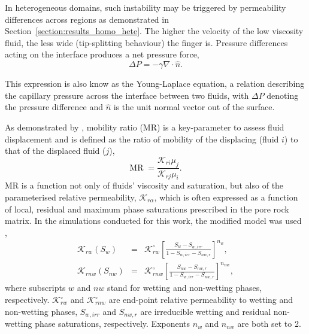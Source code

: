 \documentclass[preprint,authoryear,12pt]{elsarticle}
\newcommand{\frc}{\displaystyle\frac}
\begin{document}
\medskip 
In heterogeneous domains, such instability may be triggered by permeability differences across regions as demonstrated in Section~\ref{section:results_homo_hete}. The higher the velocity of the low viscosity fluid, the less wide (tip-splitting behaviour) the finger is. Pressure differences acting on the interface produces a net pressure force,      
\begin{equation} 
\Delta P= - \gamma \nabla\cdot\hat{n}. 
\label{eq:pressure_dif} 
\end{equation}

\noindent This expression is also know as the Young-Laplace equation, a relation describing the capillary pressure across the interface between two fluids, with $\Delta P$ denoting the pressure difference and $\hat{n}$ is the unit normal vector out of the surface. 

\medskip
As demonstrated by \citet{habermann_1960} \citep[see also][]{budek_2017}, mobility ratio (MR) is a key-parameter to assess fluid displacement and is defined as the ratio of mobility of the displacing (fluid $i$) to that of the displaced fluid ($j$),
\begin{equation}
 \text{MR} \; = \frac{\mathcal{K}_{ri} \mu_{j}}{\mathcal{K}_{rj} \mu_{i}}. 
\label{eq:MR}
\end{equation}
MR is a function not only of fluids' viscosity and saturation, but also of the parameterised relative permeability, $\mathcal{K}_{r\alpha}$, which is often expressed as a function of local, residual and maximum phase saturations prescribed in the pore rock matrix. In the simulations conducted for this work, the modified \cite{brooks_1964} model was used \citep{alpak_1999},
\begin{eqnarray}
  \mathcal{K}_{rw}\left(S_{w}\right) &=& \mathcal{K}^{\circ}_{rw}\left[\frc{S_{w}-S_{w,irr}}{1-S_{w,irr}-S_{nw,r}}\right]^{n_{w}}, \label{Eqn:CoreyBrooks1}\\
  \mathcal{K}_{rnw}\left(S_{nw}\right) &=& \mathcal{K}^{\circ}_{rnw}\left[\frc{S_{nw}-S_{nw,r}}{1-S_{w,irr}-S_{nw,r}}\right]^{n_{nw}}, \label{Eqn:CoreyBrooks2}
\end{eqnarray}
where subscripts $w$ and $nw$ stand for wetting and non-wetting phases, respectively. $\mathcal{K}^{\circ}_{rw}$ and $\mathcal{K}^{\circ}_{rnw}$ are end-point relative permeability to wetting and non-wetting phases, $S_{w,irr}$ and $S_{nw,r}$ are irreducible wetting and residual non-wetting phase saturations, respectively. Exponents $n_{w}$ and $n_{nw}$ are both set to 2.
\end{document}

